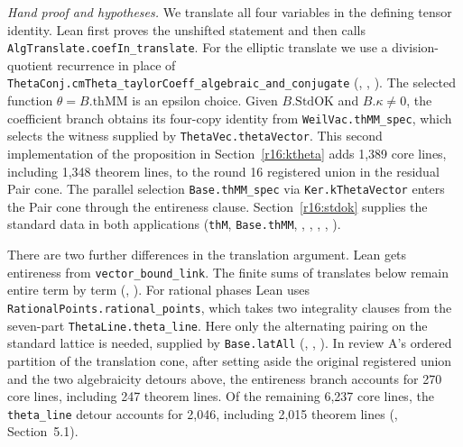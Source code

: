 \emph{Hand proof and hypotheses.} We translate all four variables in
the defining tensor identity. Lean first proves the unshifted statement
and then calls \nolinkurl{AlgTranslate.coefIn_translate}. For the elliptic
translate we use a division-quotient recurrence in place of
\nolinkurl{ThetaConj.cmTheta_taylorCoeff_algebraic_and_conjugate}
(,
,
).
The selected function $\theta=B.\mathrm{thMM}$ is an epsilon choice.
Given $B.\mathrm{StdOK}$ and $B.\kappa\ne0$, the coefficient branch
obtains its four-copy identity from \nolinkurl{WeilVac.thMM_spec},
which selects the witness supplied by \nolinkurl{ThetaVec.thetaVector}.
This second implementation of the proposition in Section~\ref{r16:ktheta}
adds 1,389 core lines, including 1,348 theorem lines, to the round 16
registered union in the residual Pair cone. The parallel selection
\nolinkurl{Base.thMM_spec} via \nolinkurl{Ker.kThetaVector} enters the
Pair cone through the entireness clause. Section~\ref{r16:stdok}
supplies the standard data in both applications
(\nolinkurl{thM}, \nolinkurl{Base.thMM}, ,
,
,
,
).

There are two further differences in the translation argument. Lean
gets entireness from \nolinkurl{vector_bound_link}. The finite sums of
translates below remain entire term by term
(,
).
For rational phases Lean uses \nolinkurl{RationalPoints.rational_points},
which takes two integrality clauses from the seven-part
\nolinkurl{ThetaLine.theta_line}. Here only the alternating pairing on
the standard lattice is needed, supplied by \nolinkurl{Base.latAll}
(,
,
).
In review A's ordered partition of the translation cone, after setting
aside the original registered union and the two algebraicity detours
above, the entireness branch accounts for 270 core lines, including
247 theorem lines. Of the remaining 6,237 core lines, the
\nolinkurl{theta_line} detour accounts for 2,046, including 2,015
theorem lines (, Section~5.1).


